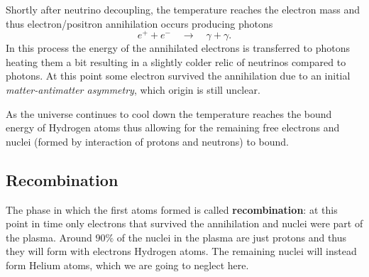 Shortly after neutrino decoupling, the temperature reaches the electron mass and thus electron/positron annihilation occurs producing photons
$$e^++e^-\quad\longrightarrow\quad \gamma+\gamma.$$ In this process the energy of the annihilated electrons is transferred to photons heating them a bit resulting in a slightly colder relic of neutrinos compared to photons. At this point some electron survived the annihilation due to an initial \emph{matter-antimatter asymmetry}, which origin is still unclear.

As the universe continues to cool down the temperature reaches the bound energy of Hydrogen atoms thus allowing for the remaining free electrons and nuclei (formed by interaction of protons and neutrons) to bound. 
\subsection{Recombination}\label{sec:recombination}
The phase in which the first atoms formed is called \textbf{recombination}: at this point in time only electrons that survived the annihilation and nuclei were part of the plasma. Around $90\%$ of the nuclei in the plasma are just protons and thus they will form with electrons Hydrogen atoms. The remaining nuclei will instead form Helium atoms, which we are going to neglect here. 

